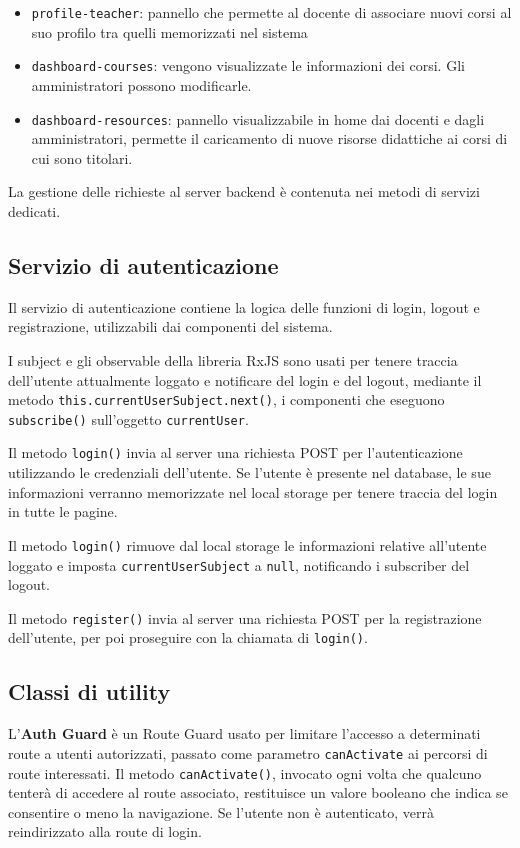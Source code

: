 \begin{itemize}
\begin{itemize}
\end{itemize}
	\item \texttt{profile-teacher}: pannello che permette al docente di associare nuovi corsi al suo profilo tra quelli memorizzati nel sistema
	\item \texttt{dashboard-courses}: vengono visualizzate le informazioni dei corsi. Gli amministratori possono modificarle.
	\item \texttt{dashboard-resources}: pannello visualizzabile in home dai docenti e dagli amministratori, permette il caricamento di nuove risorse didattiche ai corsi di cui sono titolari.
\end{itemize}

La gestione delle richieste al server backend è contenuta nei metodi di servizi dedicati.

\subsection{Servizio di autenticazione}
Il servizio di autenticazione contiene la logica delle funzioni di login, logout e registrazione, utilizzabili dai componenti del sistema.

I subject e gli observable della libreria RxJS sono usati per tenere traccia dell'utente attualmente loggato e notificare del login e del logout, mediante il metodo \texttt{this.currentUserSubject.next()}, i componenti che eseguono \texttt{subscribe()} sull'oggetto \texttt{currentUser}.

Il metodo \texttt{login()} invia al server una richiesta POST per l'autenticazione utilizzando le credenziali dell'utente. Se l'utente è presente nel database, le sue informazioni verranno memorizzate nel local storage per tenere traccia del login in tutte le pagine.

Il metodo \texttt{login()} rimuove dal local storage le informazioni relative all'utente loggato e imposta \texttt{currentUserSubject} a \texttt{null}, notificando i subscriber del logout.

Il metodo \texttt{register()} invia al server una richiesta POST per la registrazione dell'utente, per poi proseguire con la chiamata di \texttt{login()}.

\subsection{Classi di utility}

L'\textbf{Auth Guard} è un Route Guard usato per limitare l'accesso a determinati route a utenti autorizzati, passato come parametro \texttt{canActivate} ai percorsi di route interessati. Il metodo \texttt{canActivate()}, invocato ogni volta che qualcuno tenterà di accedere al route associato, restituisce un valore booleano che indica se consentire o meno la navigazione. Se l’utente non è autenticato, verrà reindirizzato alla route di login.

